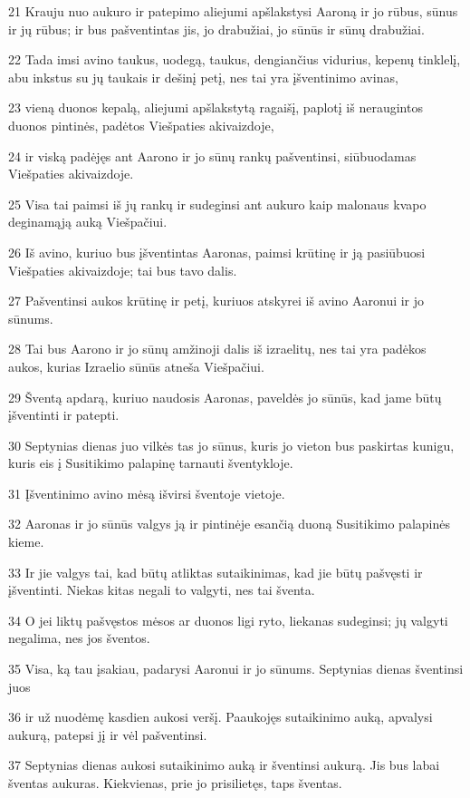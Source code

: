 \par 21 Krauju nuo aukuro ir patepimo aliejumi apšlakstysi Aaroną ir jo rūbus, sūnus ir jų rūbus; ir bus pašventintas jis, jo drabužiai, jo sūnūs ir sūnų drabužiai. 
\par 22 Tada imsi avino taukus, uodegą, taukus, dengiančius vidurius, kepenų tinklelį, abu inkstus su jų taukais ir dešinį petį, nes tai yra įšventinimo avinas, 
\par 23 vieną duonos kepalą, aliejumi apšlakstytą ragaišį, paplotį iš neraugintos duonos pintinės, padėtos Viešpaties akivaizdoje, 
\par 24 ir viską padėjęs ant Aarono ir jo sūnų rankų pašventinsi, siūbuodamas Viešpaties akivaizdoje. 
\par 25 Visa tai paimsi iš jų rankų ir sudeginsi ant aukuro kaip malonaus kvapo deginamąją auką Viešpačiui. 
\par 26 Iš avino, kuriuo bus įšventintas Aaronas, paimsi krūtinę ir ją pasiūbuosi Viešpaties akivaizdoje; tai bus tavo dalis. 
\par 27 Pašventinsi aukos krūtinę ir petį, kuriuos atskyrei iš avino Aaronui ir jo sūnums. 
\par 28 Tai bus Aarono ir jo sūnų amžinoji dalis iš izraelitų, nes tai yra padėkos aukos, kurias Izraelio sūnūs atneša Viešpačiui. 
\par 29 Šventą apdarą, kuriuo naudosis Aaronas, paveldės jo sūnūs, kad jame būtų įšventinti ir patepti. 
\par 30 Septynias dienas juo vilkės tas jo sūnus, kuris jo vieton bus paskirtas kunigu, kuris eis į Susitikimo palapinę tarnauti šventykloje. 
\par 31 Įšventinimo avino mėsą išvirsi šventoje vietoje. 
\par 32 Aaronas ir jo sūnūs valgys ją ir pintinėje esančią duoną Susitikimo palapinės kieme. 
\par 33 Ir jie valgys tai, kad būtų atliktas sutaikinimas, kad jie būtų pašvęsti ir įšventinti. Niekas kitas negali to valgyti, nes tai šventa. 
\par 34 O jei liktų pašvęstos mėsos ar duonos ligi ryto, liekanas sudeginsi; jų valgyti negalima, nes jos šventos. 
\par 35 Visa, ką tau įsakiau, padarysi Aaronui ir jo sūnums. Septynias dienas šventinsi juos 
\par 36 ir už nuodėmę kasdien aukosi veršį. Paaukojęs sutaikinimo auką, apvalysi aukurą, patepsi jį ir vėl pašventinsi. 
\par 37 Septynias dienas aukosi sutaikinimo auką ir šventinsi aukurą. Jis bus labai šventas aukuras. Kiekvienas, prie jo prisilietęs, taps šventas. 
